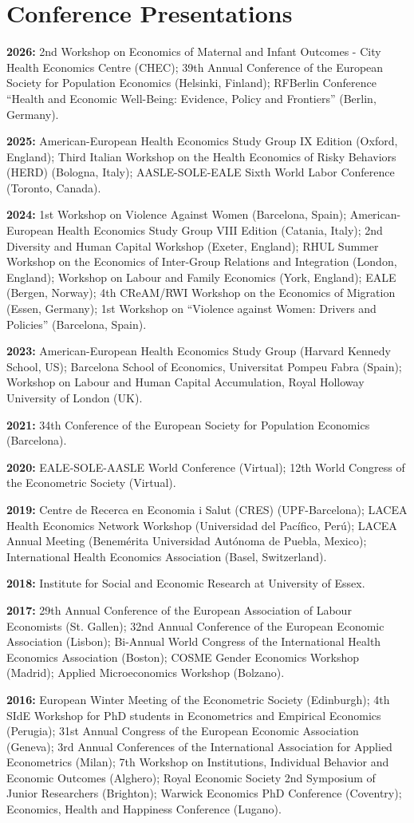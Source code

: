 \documentclass[letterpaper]{article}
\renewenvironment{itemize}{
  \begin{list}{}{
    \setlength{\leftmargin}{1.5em}
  }
}{
  \end{list}
}
\newcommand{\cvyear}[2]{\item {\bf #1:} #2}
\begin{document}
\section*{Conference Presentations}
\begin{itemize}
	\cvyear{2026}{2nd Workshop on Economics of Maternal and Infant Outcomes - City Health Economics Centre (CHEC); 39th Annual Conference of the European Society for Population Economics (Helsinki, Finland); RFBerlin Conference ``Health and Economic Well-Being: Evidence, Policy and Frontiers'' (Berlin, Germany).}
	\cvyear{2025}{American-European Health Economics Study Group IX Edition (Oxford, England); Third Italian Workshop on the Health Economics of Risky Behaviors (HERD) (Bologna, Italy); AASLE-SOLE-EALE Sixth World Labor Conference (Toronto, Canada).}
	\cvyear{2024}{1st Workshop on Violence Against Women (Barcelona, Spain); American-European Health Economics Study Group VIII Edition (Catania, Italy); 2nd Diversity and Human Capital Workshop (Exeter, England); RHUL Summer Workshop on the Economics of Inter-Group Relations and Integration (London, England); Workshop on Labour and Family Economics (York, England); EALE (Bergen, Norway); 4th CReAM/RWI Workshop on the Economics of Migration (Essen, Germany); 1st Workshop on ``Violence against Women: Drivers and Policies'' (Barcelona, Spain).}
	\cvyear{2023}{American-European Health Economics Study Group (Harvard Kennedy School, US); Barcelona School of Economics, Universitat Pompeu Fabra (Spain); Workshop on Labour and Human Capital Accumulation, Royal Holloway University of London (UK).}
	\cvyear{2021}{34th Conference of the European Society for Population Economics (Barcelona).}
	\cvyear{2020}{EALE-SOLE-AASLE World Conference (Virtual); 12th World Congress of the Econometric Society (Virtual).}
	\cvyear{2019}{Centre de Recerca en Economia i Salut (CRES) (UPF-Barcelona); LACEA Health Economics Network Workshop (Universidad del Pac\'{i}fico, Per\'{u}); LACEA Annual Meeting (Benem\'{e}rita Universidad Aut\'{o}noma de Puebla, Mexico); International Health Economics Association (Basel, Switzerland).}
	\cvyear{2018}{Institute for Social and Economic Research at University of Essex.}
	\cvyear{2017}{29th Annual Conference of the European Association of Labour Economists (St. Gallen); 32nd Annual Conference of the European Economic Association (Lisbon); Bi-Annual World Congress of the International Health Economics Association (Boston); COSME Gender Economics Workshop (Madrid); Applied Microeconomics Workshop (Bolzano).}
	\cvyear{2016}{European Winter Meeting of the Econometric Society (Edinburgh); 4th SIdE Workshop for PhD students in Econometrics and Empirical Economics (Perugia); 31st Annual Congress of the European Economic Association (Geneva); 3rd Annual Conferences of the International Association for Applied Econometrics (Milan); 7th Workshop on Institutions, Individual Behavior and Economic Outcomes (Alghero); Royal Economic Society 2nd Symposium of Junior Researchers (Brighton); Warwick Economics PhD Conference (Coventry); Economics, Health and Happiness Conference (Lugano).}

\end{itemize}
\end{document}
